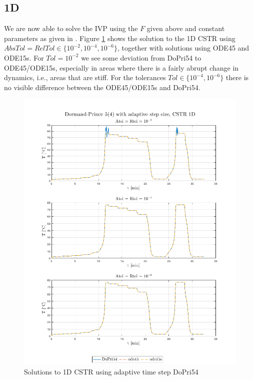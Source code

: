 \subsection{1D}
We are now able to solve the IVP using the $F$ given above and constant parameters as given in \cite{cstr}. Figure \ref{fig6:1d_sol} shows the solution to the 1D CSTR using $AbsTol=RelTol \in \{10^{-2}, 10^{-4}, 10^{-6}\}$, together with solutions using ODE45 and ODE15s. For $Tol=10^{-2}$ we see some deviation from DoPri54 to ODE45/ODE15s, especially in areas where there is a fairly abrupt change in dynamics, i.e., areas that are stiff. For the tolerances $Tol \in \{10^{-4}, 10^{-6}\}$ there is no visible difference between the ODE45/ODE15s and DoPri54.

\begin{figure}[H]
    \centering
    \includegraphics[width=\textwidth]{graphics/opg6/cstr-1d.png}
    \caption{Solutions to 1D CSTR using adaptive time step DoPri54}
    \label{fig6:1d_sol}
\end{figure}

